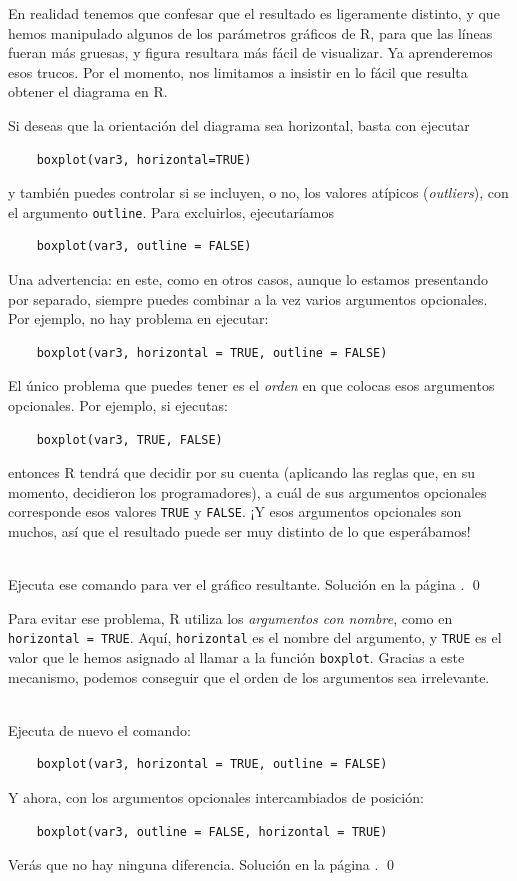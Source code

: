 \documentclass[10pt,a4paper]{article}\usepackage[]{graphicx}\usepackage[]{color}
\newcounter {cont01}
\begin{document}
En realidad tenemos que confesar que el resultado es ligeramente distinto, y que hemos manipulado algunos de los parámetros gráficos de R, para que las líneas fueran más gruesas, y figura resultara más fácil de visualizar. Ya aprenderemos esos trucos. Por el momento, nos limitamos a insistir en lo fácil que resulta obtener el diagrama en R.

Si deseas que la orientación del diagrama sea horizontal, basta con ejecutar
\begin{verbatim}
    boxplot(var3, horizontal=TRUE)
\end{verbatim}
y también puedes controlar si se incluyen, o no, los valores atípicos ({\em outliers}), con el argumento {\tt outline}. Para excluirlos, ejecutaríamos
\begin{verbatim}
    boxplot(var3, outline = FALSE)
\end{verbatim}
Una advertencia: en este, como en otros casos, aunque lo estamos presentando por separado, siempre puedes combinar a la vez varios argumentos opcionales. Por ejemplo, no hay problema en ejecutar:
\begin{verbatim}
    boxplot(var3, horizontal = TRUE, outline = FALSE)
\end{verbatim}
El único problema que puedes tener es el {\em orden} en que colocas esos argumentos opcionales. Por ejemplo, si ejecutas:
\begin{verbatim}
    boxplot(var3, TRUE, FALSE)
\end{verbatim}
entonces R tendrá que decidir por su cuenta (aplicando las reglas que, en su momento, decidieron los programadores), a cuál de sus argumentos opcionales corresponde esos valores {\tt TRUE} y {\tt FALSE}. ¡Y esos argumentos opcionales son muchos, así que el resultado puede ser muy distinto de lo que esperábamos!
\begin{ejercicio}
\label{tut02:ejercicio14}
\quad\\
Ejecuta ese comando para ver el gráfico resultante. Solución en la página \pageref{tut02:ejercicio14:sol}.  \qed
\end{ejercicio}
Para evitar ese problema, R utiliza los {\em argumentos con nombre}, como en {\tt horizontal = TRUE}. Aquí, {\tt horizontal} es el nombre del argumento, y {\tt TRUE} es el valor que le hemos asignado al llamar a la función {\tt boxplot}. Gracias a este mecanismo, podemos conseguir que el orden de los argumentos sea irrelevante.
\begin{ejercicio}
\label{tut02:ejercicio15}
\quad\\
Ejecuta de nuevo el comando:
\begin{verbatim}
    boxplot(var3, horizontal = TRUE, outline = FALSE)
\end{verbatim}
Y ahora, con los argumentos opcionales intercambiados de posición:
\begin{verbatim}
    boxplot(var3, outline = FALSE, horizontal = TRUE)
\end{verbatim}
Verás que no hay ninguna diferencia. Solución en la página \pageref{tut02:ejercicio15:sol}.
\qed
\end{ejercicio}
\end{document}
